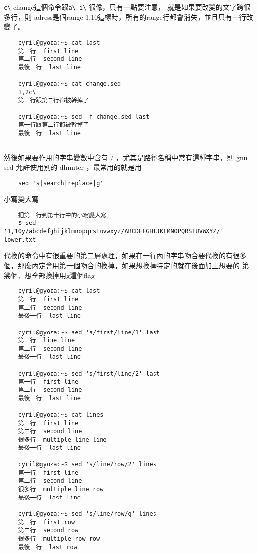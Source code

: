     \verb=c\= change這個命令跟\verb=a\ i\= 很像，只有一點要注意，
    就是如果要改變的文字跨很多行，則
    adress是個range 1,10這樣時，所有的range行都會消失，並且只有一行改變了。
    \begin{verbatim}
    cyril@gyoza:~$ cat last
    第一行  first line
    第二行  second line
    最後一行  last line

    cyril@gyoza:~$ cat change.sed 
    1,2c\
    第一行跟第二行都被幹掉了
    
    cyril@gyoza:~$ sed -f change.sed last
    第一行跟第二行都被幹掉了
    最後一行  last line
    
    \end{verbatim}
    然後如果要作用的字串變數中含有 / ，尤其是路徑名稱中常有這種字串，則 gnu
    sed 允許使用別的 dlimiter ，最常用的就是用 |
    \begin{verbatim}
    sed 's|search|replace|g'
    \end{verbatim}
    小寫變大寫
    \begin{verbatim}
    把第一行到第十行中的小寫變大寫
    $ sed '1,10y/abcdefghijklmnopqrstuvwxyz/ABCDEFGHIJKLMNOPQRSTUVWXYZ/' lower.txt
    \end{verbatim}
    代換的命令中有很重要的第二層處理，如果在一行內的字串吻合要代換的有很多
    個，那麼內定會用第一個吻合的換掉，如果想換掉特定的就在後面加上想要的
    第幾個，想全部換掉用g這個flag
    \begin{verbatim}
    cyril@gyoza:~$ cat last
    第一行  first line
    第二行  second line
    最後一行  last line

    cyril@gyoza:~$ sed 's/first/line/1' last
    第一行  line line
    第二行  second line
    最後一行  last line

    cyril@gyoza:~$ sed 's/first/line/2' last
    第一行  first line
    第二行  second line
    最後一行  last line

    cyril@gyoza:~$ cat lines
    第一行  first line
    第二行  second line
    很多行  multiple line line
    最後一行  last line

    cyril@gyoza:~$ sed 's/line/row/2' lines
    第一行  first line
    第二行  second line
    很多行  multiple line row
    最後一行  last line

    cyril@gyoza:~$ sed 's/line/row/g' lines
    第一行  first row
    第二行  second row
    很多行  multiple row row
    最後一行  last row
    \end{verbatim}
